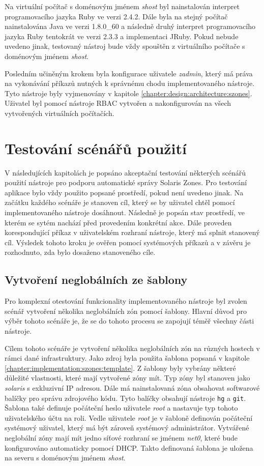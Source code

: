 Na virtuální počítač s doménovým jménem \textit{shost} byl nainstalován interpret programovacího jazyka Ruby ve verzi 2.4.2.
Dále byla na stejný počítač nainstalována Java ve verzi 1.8.0\_60 a následně druhý interpret programovacího jazyka Ruby
tentokrát ve verzi 2.3.3 a implementaci JRuby. Pokud nebude uvedeno jinak, testovaný nástroj bude vždy spouštěn z virtuálního
počítače s doménovým jménem \textit{shost}.

Posledním učiněným krokem byla konfigurace uživatele \textit{zadmin}, který má práva na vykonávání příkazů nutných k správnému
chodu implementovaného nástroje. Tyto nástroje byly vyjmenovány v kapitole \ref{chapter:design:architecture:szones}. Uživatel 
byl pomocí nástroje RBAC vytvořen a nakonfigurován na všech vytvořených virtuálních počítačích.
\section{Testování scénářů použití}
\label{chapter:testing:scenario}
V následujících kapitolách je popsáno akceptační testování některých scénářů použití nástroje pro podporu automatické správy
Solaris Zones.  Pro testování aplikace bylo vždy použito popsané prostředí, pokud není uvedeno jinak. Na začátku každého scénáře
je stanoven cíl, který se by uživatel chtěl pomocí implementovaného nástroje dosáhnout. Následně je popsán stav prostředí, ve
kterém se sytém nachází před provedením konkrétní akce. Dále proveden korespondující příkaz v uživatelském rozhraní nástroje,
který má splnit stanovený cíl. Výsledek tohoto kroku je ověřen pomocí systémových příkazů a v závěru je rozhodnuto, zda bylo
dosaženo stanoveného cíle.
\subsection{Vytvoření neglobálních ze šablony}
\label{chapter:testing:scenario:deploy_template}
Pro komplexní otestování funkcionality implementovaného nástroje byl zvolen scénář vytvoření několika neglobálních zón pomocí
šablony. Hlavní důvod pro výběr tohoto scénáře je, že se do tohoto procesu se zapojují téměř všechny části nástroje.

Cílem tohoto scénáře je vytvoření několika neglobálních zón na různých hostech v rámci dané infrastruktury. Jako zdroj byla 
použita šablona popsaná v kapitole \ref{chapter:implementation:szones:template}. Z šablony byly vybrány některé důležité 
vlastnosti, které mají vytvořené zóny mít. Typ zóny byl stanoven jako \textit{solaris} s exkluzivní IP adresou. Dále má 
nainstalovaná zóna obsahovat softwarové balíčky pro správu zdrojového kódu. Tyto balíčky obsahují nástroje \verb|hg| a 
\verb|git|. Šablona také definuje počáteční heslo uživatele \textit{root} a nastavuje typ tohoto uživatelského účtu na roli.
Vedle uživatele \textit{root} je v šabloně definován počáteční systémový uživatel, který má být zároveň systémový administrátor.
Vytvářené neglobální zóny mají mít jedno síťové rozhraní se jménem \textit{net0}, které bude konfigurováno automaticky pomocí
DHCP. Takto definovaná šablona je uložena na severu s doménovým jménem \textit{shost}.

